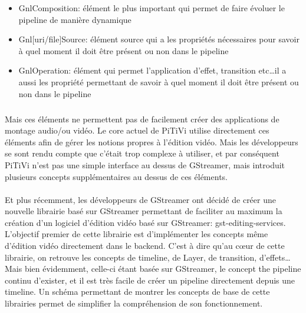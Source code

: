 \begin{itemize}

  \item {GnlComposition: élément le plus important qui permet de faire
  évoluer le pipeline de manière dynamique}

  \item{Gnl[uri/file]Source: élément source qui a les propriétés
    nécessaires pour savoir à quel moment il doit être présent ou
    non dans le pipeline}

  \item{GnlOperation: élément qui permet l'application d'effet,
  transition etc\ldots il a aussi les propriété permettant de savoir
  à quel
    moment il doit être présent ou non dans le pipeline}

\end{itemize}

\subparagraph{}

Mais ces éléments ne permettent pas de facilement créer des
applications de montage audio/ou vidéo. Le core actuel de PiTiVi
utilise directement ces éléments afin de gérer les notions propres
à l'édition vidéo.  Mais les développeurs se sont rendu compte que
c'était trop complexe à utiliser, et par conséquent PiTiVi n'est pas
une simple interface au dessus de GStreamer, mais introduit plusieurs
concepts supplémentaires au dessus de ces éléments.

\paragraph{}

Et plus récemment, les développeurs de GStreamer ont décidé de créer
une nouvelle librairie basé sur GStreamer permettant de faciliter
au maximum la création d'un logiciel d'édition vidéo basé sur
GStreamer: gst-editing-services.  L'objectif premier de cette librairie
est d'implémenter les concepts même d'édition vidéo directement dans
le backend. C'est à dire qu'au cœur de cette librairie, on retrouve
les concepts de timeline, de Layer, de transition, d'effets\ldots Mais
bien évidemment, celle-ci étant basée sur GStreamer, le concept
the pipeline continu d'exister, et il est très facile de créer un
pipeline directement depuis une timeline. Un schéma permettant de
montrer les concepts de base de cette librairies permet de simplifier
la compréhension de son fonctionnement.

